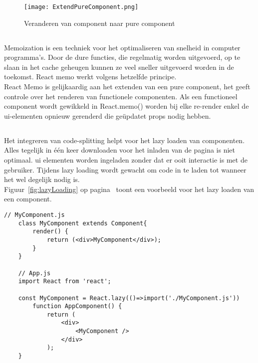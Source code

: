 \begin{figure}[H]
    \texttt{[image: ExtendPureComponent.png]}
    \caption{Veranderen van component naar pure component}
    \label{fig:extendPureComponent}
\end{figure}



\subsection{}
\label{sec:memo}

Memoization is een techniek voor het optimaliseren van snelheid in computer programma's. Door de dure functies, die regelmatig worden uitgevoerd, op te slaan in het cache geheugen kunnen ze veel sneller uitgevoerd worden in de toekomst. React memo werkt volgens hetzelfde principe.\\
React Memo is gelijkaardig aan het extenden van een pure component, het geeft controle over het renderen van functionele componenten. Als een functioneel component wordt gewikkeld in React.memo() worden bij elke re-render enkel de \gls{ui}-elementen opnieuw gerenderd die geüpdatet props nodig hebben.

\subsection{}
\label{sec:lazy}

Het integreren van code-splitting helpt voor het lazy loaden van componenten. Alles tegelijk in één keer downloaden voor het inladen van de pagina is niet optimaal. \gls{ui} elementen worden ingeladen zonder dat er ooit interactie is met de gebruiker. Tijdens lazy loading wordt gewacht om code in te laden tot wanneer het wel degelijk nodig is.\\
Figuur~\ref{fig:lazyLoading} op pagina~\pageref{fig:lazyLoading} toont een voorbeeld voor het lazy loaden van een component.

\begin{lstlisting}[caption=Lazy loading a component, label={fig:lazyLoading}]
    // MyComponent.js
    class MyComponent extends Component{
        render() {
            return (<div>MyComponent</div>);
        }
    }
    
    // App.js
    import React from 'react';
    
    const MyComponent = React.lazy(()=>import('./MyComponent.js'))
        function AppComponent() {
            return (
                <div>
                    <MyComponent />
                </div>
            );
    }
\end{lstlisting}

